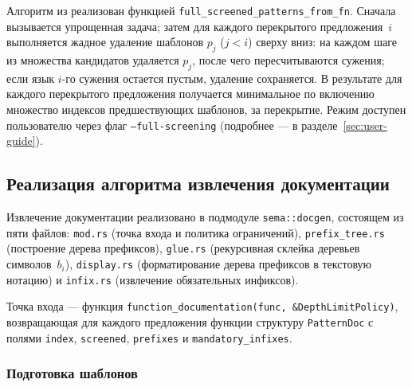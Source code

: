 Алгоритм из  реализован функцией \texttt{full\_screened\_patterns\_from\_fn}.
Сначала вызывается упрощенная задача; затем для каждого перекрытого предложения~$i$ выполняется жадное удаление шаблонов $p_j$ ($j < i$) сверху вниз: на каждом шаге из множества кандидатов удаляется $p_j$, после чего пересчитываются сужения; если язык $i$-го сужения остается пустым, удаление сохраняется.
В результате для каждого перекрытого предложения получается минимальное по включению множество индексов предшествующих шаблонов,  за перекрытие.
Режим доступен пользователю через флаг \texttt{--full-screening} (подробнее --- в разделе~\ref{sec:user-guide}).



\subsection{Реализация алгоритма извлечения документации}

Извлечение документации реализовано в подмодуле \texttt{sema::docgen}, состоящем из пяти файлов: \texttt{mod.rs} (точка входа и политика ограничений), \texttt{prefix\_tree.rs} (построение дерева префиксов), \texttt{glue.rs} (рекурсивная склейка деревьев символов~$b_i$), \texttt{display.rs} (форматирование дерева префиксов в текстовую нотацию) и \texttt{infix.rs} (извлечение обязательных инфиксов).

Точка входа --- функция \texttt{function\_documentation(func, \&DepthLimitPolicy)}, возвращающая для каждого предложения функции структуру \texttt{PatternDoc} с полями \texttt{index}, \texttt{screened}, \texttt{prefixes} и \texttt{mandatory\_infixes}.

\subsubsection{Подготовка шаблонов}

